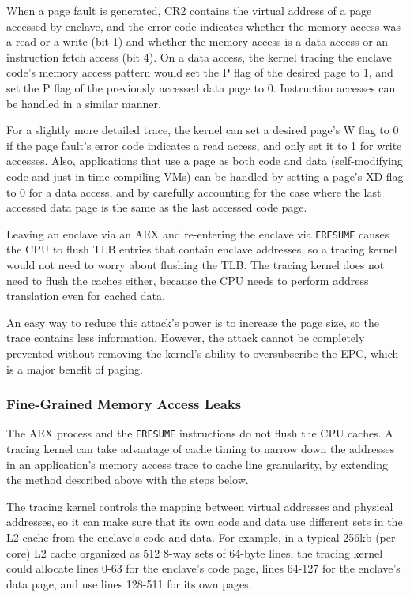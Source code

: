 When a page fault is generated, CR2 contains the virtual address of a page
accessed by enclave, and the error code indicates whether the memory access was
a read or a write (bit 1) and whether the memory access is a data access or
an instruction fetch access (bit 4). On a data access, the kernel tracing the
enclave code's memory access pattern would set the P flag of the desired page
to 1, and set the P flag of the previously accessed data page to 0. Instruction
accesses can be handled in a similar manner.

For a slightly more detailed trace, the kernel can set a desired page's W flag
to 0 if the page fault's error code indicates a read access, and only set it to
1 for write accesses. Also, applications that use a page as both code and data
(self-modifying code and just-in-time compiling VMs) can be handled by setting
a page's XD flag to 0 for a data access, and by carefully accounting for the
case where the last accessed data page is the same as the last accessed code
page.

Leaving an enclave via an AEX and re-entering the enclave via \texttt{ERESUME}
causes the CPU to flush TLB entries that contain enclave addresses, so a
tracing kernel would not need to worry about flushing the TLB. The tracing
kernel does not need to flush the caches either, because the CPU needs to
perform address translation even for cached data.

An easy way to reduce this attack's power is to increase the page size, so the
trace contains less information. However, the attack cannot be completely
prevented without removing the kernel's ability to oversubscribe the EPC,
which is a major benefit of paging.

\subsubsection{Fine-Grained Memory Access Leaks}

The AEX process and the \texttt{ERESUME} instructions do not flush the CPU
caches. A tracing kernel can take advantage of cache timing to narrow down
the addresses in an application's memory access trace to cache line
granularity, by extending the method described above with the steps below.

The tracing kernel controls the mapping between virtual addresses and physical
addresses, so it can make sure that its own code and data use different sets
in the L2 cache from the enclave's code and data. For example, in a typical
256kb (per-core) L2 cache organized as 512 8-way sets of 64-byte lines, the
tracing kernel could allocate lines 0-63 for the enclave's code page, lines
64-127 for the enclave's data page, and use lines 128-511 for its own pages.

